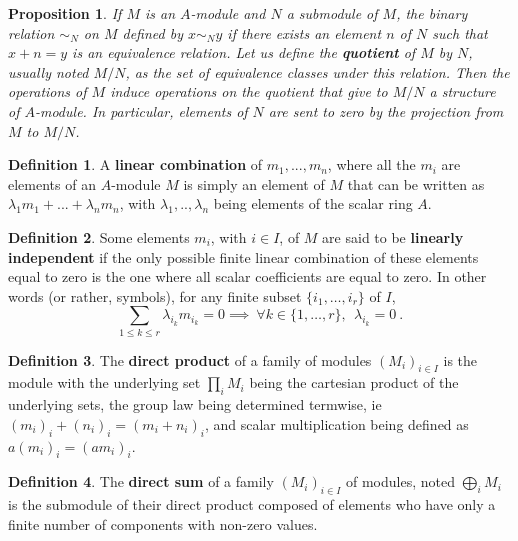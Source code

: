 \documentclass{report}
\newtheorem{prop}{Proposition}
\theoremstyle{definition}
\newtheorem{defin}{Definition}
\theoremstyle{remark}
\begin{document}
  
  \begin{prop}
   If $M$ is an $A$-module and $N$ a submodule of $M$, the binary relation $\sim_N$ on $M$ defined by $x\sim_Ny$ if there exists an element $n$ of $N$ such that $x + n = y$ is an equivalence relation. 
   Let us define the \textbf{quotient} of $M$ by $N$, usually noted $M/N$, as the set of equivalence classes under this relation. Then the operations of $M$ induce operations on the quotient that give to $M/N$ a structure of $A$-module. In particular, elements of $N$ are sent to zero by the projection from $M$ to $M/N$. 
  \end{prop}
 
 
  \begin{defin}
    A \textbf{linear combination} of $m_1,...,m_n$, where all the $m_i$ are elements of an $A$-module $M$ is simply an element of $M$ that can be written as $\lambda_1m_1 + ... + \lambda_nm_n$, with $\lambda_1,..,\lambda_n$ being elements of the scalar ring $A$.
  \end{defin}
 
 \begin{defin}
    Some elements $m_i$, with $i\in I$, of $M$ are said to be \textbf{linearly independent} if the only possible finite linear combination of these elements equal to zero is the one where all scalar coefficients are equal to zero. In other words (or rather, symbols), for any finite subset $\{i_1,\dots,i_r\}$ of $I$, $$\sum_{1\leq k\leq r}\lambda_{i_k} m_{i_k} = 0 \implies \ \forall k \in \{1,\dots,r\}, \ \ \lambda_{i_k} = 0 \ .$$
 \end{defin}
 
 
  \begin{defin}
  The \textbf{direct product} of a family of modules $(M_i)_{i\in I}$ is the module with the underlying set $\prod_i M_i$ being the cartesian product of the underlying sets, the group law being determined termwise, ie $(m_i)_i + (n_i)_i = (m_i + n_i)_i$, and scalar multiplication being defined as $a(m_i)_i = (am_i)_i$.
  \end{defin}
  
 \begin{defin}
    The \textbf{direct sum} of a family $(M_i)_{i \in I}$ of modules, noted $ \bigoplus_i M_i$ is the submodule of their direct product composed of elements who have only a finite number of components with non-zero values.  
 \end{defin}
  
\end{document}
